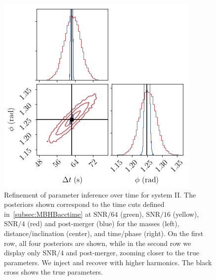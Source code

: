 \documentclass[aps,showpacs,twocolumn,prd,superscriptaddress,nofootinbib]{revtex4-1}
\begin{document}
\begin{figure}
\begin{minipage}{.32\linewidth}
   \end{minipage}
   \begin{minipage}{.32\linewidth}
      \includegraphics[width=.99\linewidth]{corner_smbh_case9_hm_tseries_tphi_zoom.png}
   \end{minipage}
  \caption{Refinement of parameter inference over time for system II. The posteriors shown correspond to the time cuts defined in~\ref{subsec:MBHBacctime} at $\mathrm{SNR}/64$ (green), $\mathrm{SNR}/16$ (yellow), $\mathrm{SNR}/4$ (red) and post-merger (blue) for the masses (left), distance/inclination (center), and time/phase (right). On the first row, all four posteriors are shown, while in the second row we display only $\mathrm{SNR}/4$ and post-merger, zooming closer to the true parameters. We inject and recover with higher harmonics. The black cross shows the true parameters.}
  \label{fig:smbhCornerZoomHMCase9}
\end{figure}
\end{document}
